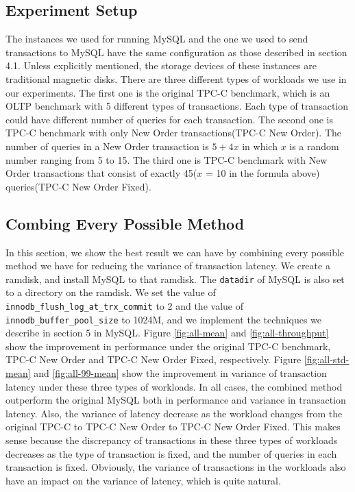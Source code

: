 
\subsection{Experiment Setup}
The instances we used for running MySQL and the one we used to send 
transactions to MySQL have the same configuration as those described in
section 4.1. Unless explicitly mentioned, the storage devices of these
instances are traditional magnetic disks. There are three different types of
workloads we use in our experiments. The first one is the original TPC-C
benchmark, which is an OLTP benchmark with 5 different types of transactions.
Each type of transaction could have different number of queries for each
transaction. The second one is TPC-C benchmark with only New Order 
transactions(TPC-C New Order). The number of queries in a New Order
transaction is $5 + 4x$ in which $x$ is a random number ranging from 5 to 15.
The third one is TPC-C benchmark with New Order transactions that consist of
exactly 45($x$ = 10 in the formula above) queries(TPC-C New Order Fixed).

\subsection{Combing Every Possible Method}
In this section, we show the best result we can have by combining every
possible method we have for reducing the variance of transaction latency.
We create a ramdisk, and install MySQL to that ramdisk. The \texttt{datadir}
of MySQL is also set to a directory on the ramdisk. We set the value of
\texttt{innodb\_flush\_log\_at\_trx\_commit} to 2 and the value of
\texttt{innodb\_buffer\_pool\_size} to 1024M, and we implement the techniques
we describe in section 5 in MySQL. Figure \ref{fig:all-mean} and
\ref{fig:all-throughput} show the improvement in performance under the original
TPC-C benchmark, TPC-C New Order and TPC-C New Order Fixed, respectively.
Figure \ref{fig:all-std-mean} and \ref{fig:all-99-mean} show the improvement in
variance of transaction latency under these three types of workloads. In all
cases, the combined method outperform the original MySQL both in performance
and variance in transaction latency. Also, the variance of latency decrease as
the workload changes from the original TPC-C to TPC-C New Order to TPC-C New
Order Fixed. This makes sense because the discrepancy of transactions in these
three types of workloads decreases as the type of transaction is fixed, and the
number of queries in each transaction is fixed. Obviously, the variance of
transactions in the workloads also have an impact on the variance of latency,
which is quite natural.

